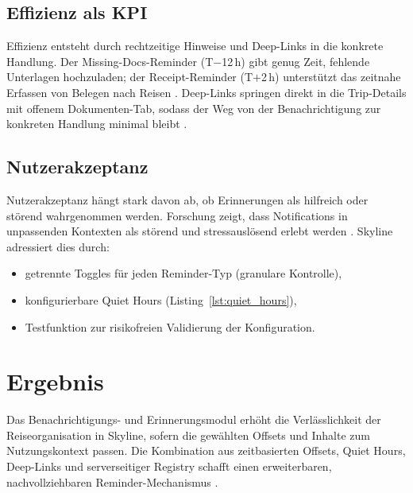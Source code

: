 \subsection{Effizienz als KPI}

Effizienz entsteht durch rechtzeitige Hinweise und Deep-Links in die konkrete Handlung.
Der Missing-Docs-Reminder (T$-$12\,h) gibt genug Zeit, fehlende Unterlagen hochzuladen;
der Receipt-Reminder (T$+$2\,h) unterstützt das zeitnahe Erfassen von Belegen nach Reisen
\cite{mitSavingReceipts}.
Deep-Links springen direkt in die Trip-Details mit offenem Dokumenten-Tab,
sodass der Weg von der Benachrichtigung zur konkreten Handlung minimal bleibt
\cite{reactNavDeepLink}.

\subsection{Nutzerakzeptanz}

Nutzerakzeptanz hängt stark davon ab, ob Erinnerungen als hilfreich oder störend
wahrgenommen werden.
Forschung zeigt, dass Notifications in unpassenden Kontexten als störend und
stressauslösend erlebt werden \cite{ozdemir2025echoes,visuri2019notifications}.
Skyline adressiert dies durch:

\begin{itemize}
  \item getrennte Toggles für jeden Reminder-Typ (granulare Kontrolle),
  \item konfigurierbare Quiet Hours (Listing~\ref{lst:quiet_hours}),
  \item Testfunktion zur risikofreien Validierung der Konfiguration.
\end{itemize}

\section{Ergebnis}
\label{sec:notifications-result}

Das Benachrichtigungs- und Erinnerungsmodul erhöht die Verlässlichkeit der
Reiseorganisation in Skyline, sofern die gewählten Offsets und Inhalte zum
Nutzungskontext passen.
Die Kombination aus zeitbasierten Offsets, Quiet Hours, Deep-Links und serverseitiger
Registry schafft einen erweiterbaren, nachvollziehbaren Reminder-Mechanismus
\cite{expoNotificationsSDK,supabaseSecuringApi,ozdemir2025echoes}.

